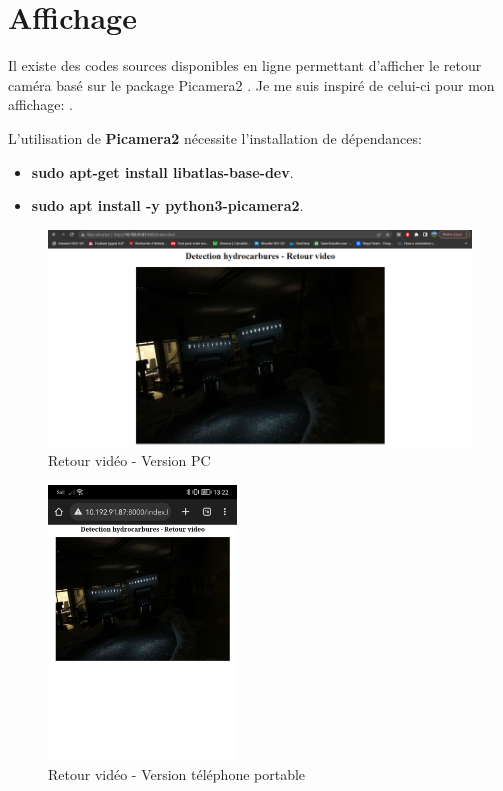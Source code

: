 \newpage
\section{Affichage}
Il existe des codes sources disponibles en ligne permettant d'afficher le retour caméra basé sur le package Picamera2 \cite{picamera2}.
Je me suis inspiré de celui-ci pour mon affichage: \cite{code_camera}.

L'utilisation de \textbf{Picamera2} nécessite l'installation de dépendances:
\begin{itemize}
    \item \textbf{sudo apt-get install libatlas-base-dev}.
    \item \textbf{sudo apt install -y python3-picamera2}.
\end{itemize}

\begin{figure}[H]
    \centering
    \includegraphics[width=13cm]{assets/figures/retour_video_pc.png}
    \caption{Retour vidéo - Version PC}
\end{figure}

\begin{figure}[H]
    \centering
    \includegraphics[width=5cm]{assets/figures/retour_video_natel.jpg}
    \caption{Retour vidéo - Version téléphone portable}
\end{figure}


